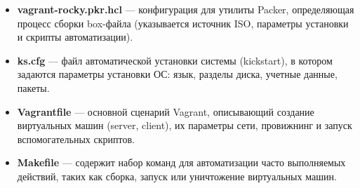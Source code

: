 \begin{enumerate}
  \begin{itemize}
  \tightlist
  \item
    \textbf{vagrant-rocky.pkr.hcl} --- конфигурация для утилиты Packer,
    определяющая процесс сборки box-файла (указывается источник ISO,
    параметры установки и скрипты автоматизации).\\
  \item
    \textbf{ks.cfg} --- файл автоматической установки системы
    (kickstart), в котором задаются параметры установки ОС: язык,
    разделы диска, учетные данные, пакеты.\\
  \item
    \textbf{Vagrantfile} --- основной сценарий Vagrant, описывающий
    создание виртуальных машин (server, client), их параметры сети,
    провижнинг и запуск вспомогательных скриптов.\\
  \item
    \textbf{Makefile} --- содержит набор команд для автоматизации часто
    выполняемых действий, таких как сборка, запуск или уничтожение
    виртуальных машин.
  \end{itemize}
\end{enumerate}
